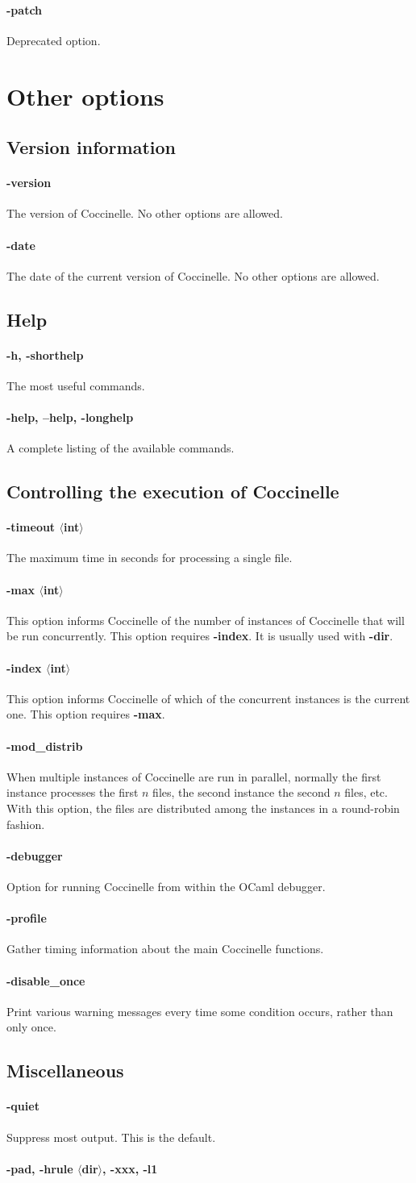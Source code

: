 \documentclass{article}
\newcommand{\minimum}[2]{\paragraph*{\makebox[0in][r]{\FilledBigDiamondshape\,\,} {{#1}}} {#2}}
\newcommand{\normal}[2]{\paragraph*{\makebox[0in][r]{\BigLowerDiamond\,\,} {{#1}}} {#2}}
\newcommand{\rare}[2]{\paragraph*{\makebox[0in][r]{\BigDiamondshape\,\,} {{#1}}} {#2}}
\newcommand{\developer}[2]{\paragraph*{{#1}} {#2}}
\begin{document}
\developer{-patch}{ Deprecated option.}


\section{Other options}

\subsection{Version information}

\normal{-version}{ The version of Coccinelle.  No other options are
allowed.}

\normal{-date}{ The date of the current version of Coccinelle. No other
options are allowed.}

\subsection{Help}

\minimum{-h, -shorthelp}{ The most useful commands.}

\minimum{-help, --help, -longhelp}{ A complete listing of the available
commands.}

\subsection{Controlling the execution of Coccinelle}

\normal{-timeout $\langle$int$\rangle$}{ The maximum time in seconds for
  processing a single file.}

\rare{-max $\langle$int$\rangle$}{This option informs Coccinelle of the
  number of instances of Coccinelle that will be run concurrently.  This
  option requires {\bf -index}.  It is usually used with {\bf -dir}.}

\rare{-index $\langle$int$\rangle$}{This option informs Coccinelle of
  which of the concurrent instances is the current one.  This option
  requires {\bf -max}.}

\rare{-mod\_distrib}{When multiple instances of Coccinelle are run in
  parallel, normally the first instance processes the first $n$ files, the
  second instance the second $n$ files, etc.  With this option, the files
  are distributed among the instances in a round-robin fashion.}

\developer{-debugger}{Option for running Coccinelle from within the OCaml
  debugger.}

\developer{-profile}{ Gather timing information about the main Coccinelle
functions.}

\developer{-disable\_once}{Print various warning messages every time some
condition occurs, rather than only once.}

\subsection{Miscellaneous}

\rare{-quiet}{Suppress most output.  This is the default.}

\developer{-pad, -hrule $\langle$dir$\rangle$, -xxx, -l1}{}
\end{document}
